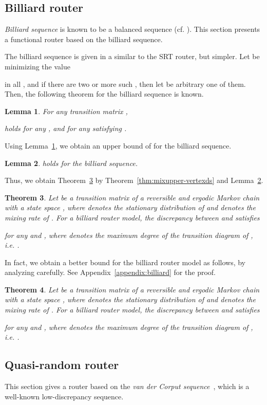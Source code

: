 \documentclass[letter, 11pt]{article}
\newcommand{\1}{\mbox{1}\hspace{-0.25em}\mbox{l}}
\newtheorem{theorem}{Theorem}[section]
\newtheorem{lemma}[theorem]{Lemma}
\begin{document}
\subsection{Billiard router}\label{sec:billiard}{\em Billiard sequence} is known to be a balanced sequence (cf. \cite{SMK04}). 
This section presents a functional router based on the billiard sequence. 

The billiard sequence is given in a similar to the SRT router, but simpler. 
Let  be  minimizing the value 

in all , and if there are two or more such , then let  be arbitrary one of them. 
Then, the following theorem for the billiard sequence is known. 
\begin{lemma}\label{bound:billiardz}\cite{SMK04}
For any transition matrix , 

 holds for any , and for any  satisfying . 
\end{lemma}
Using Lemma~\ref{bound:billiardz}, we obtain an upper bound of  for the billiard sequence. 
\begin{lemma}\label{bound:billiard}
 holds for the billiard sequence. 
\end{lemma}
Thus, we obtain Theorem~\ref{thm:mixupper-vertexbi}
  by Theorem~\ref{thm:mixupper-vertexds} and Lemma~\ref{bound:billiard}. 
\begin{theorem}
\label{thm:mixupper-vertexbi}
 Let  be a transition matrix of 
  a reversible and ergodic Markov chain with a state space , where  denotes the stationary distribution of  and  denotes the mixing rate of . 
  For a billiard router model, the discrepancy between  and  satisfies

  for any  and , where  denotes the maximum degree of the transition diagram of , {\rm i.e.} . 
\end{theorem}
In fact, we obtain a better bound for the billiard router model as follows, by analyzing carefully. See Appendix~\ref{appendix:billiard} for the proof. 
\begin{theorem}
\label{thm:mixupper-vertexbi2}
 Let  be a transition matrix of 
  a reversible and ergodic Markov chain with a state space , where  denotes the stationary distribution of  and  denotes the mixing rate of . 
  For a billiard router model, the discrepancy between  and  satisfies

  for any  and , where  denotes the maximum degree of the transition diagram of , {\rm i.e.} . 
\end{theorem}

\subsection{Quasi-random router}\label{sec:vander}This section gives a router  
  based on the {\em van der Corput sequence}~\cite{JGV35,N78}, 
 which is a well-known low-discrepancy sequence. 
\end{document}

